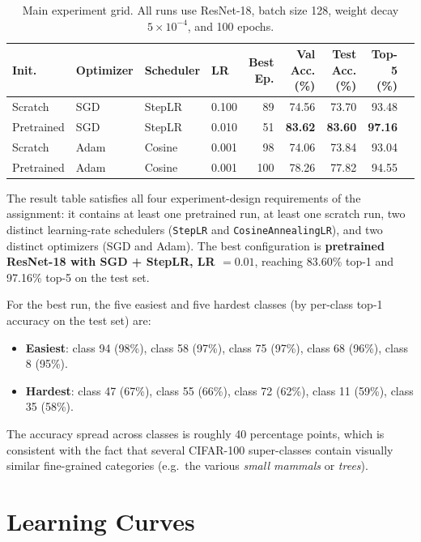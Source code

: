 \documentclass[10pt,a4paper]{article}
\begin{document}
\begin{table}[h]
\centering
\caption{Main experiment grid. All runs use ResNet-18, batch size 128, weight decay $5\times 10^{-4}$, and 100 epochs.}
\label{tab:results}
\begin{tabular}{llllrrrrr}
\toprule
Init. & Optimizer & Scheduler & LR & Best Ep. & Val Acc. (\%) & Test Acc. (\%) & Top-5 (\%) \\
\midrule
Scratch    & SGD  & StepLR & 0.100 &  89 & 74.56 & 73.70 & 93.48 \\
Pretrained & SGD  & StepLR & 0.010 &  51 & \textbf{83.62} & \textbf{83.60} & \textbf{97.16} \\
Scratch    & Adam & Cosine & 0.001 &  98 & 74.06 & 73.84 & 93.04 \\
Pretrained & Adam & Cosine & 0.001 & 100 & 78.26 & 77.82 & 94.55 \\
\bottomrule
\end{tabular}
\end{table}

The result table satisfies all four experiment-design requirements of the assignment: it contains at least one pretrained run, at least one scratch run, two distinct learning-rate schedulers (\texttt{StepLR} and \texttt{CosineAnnealingLR}), and two distinct optimizers (SGD and Adam). The best configuration is \textbf{pretrained ResNet-18 with SGD + StepLR, LR $= 0.01$}, reaching 83.60\% top-1 and 97.16\% top-5 on the test set.

For the best run, the five easiest and five hardest classes (by per-class top-1 accuracy on the test set) are:

\begin{itemize}[leftmargin=*,itemsep=0pt]
    \item \textbf{Easiest}: class 94 (98\%), class 58 (97\%), class 75 (97\%), class 68 (96\%), class 8 (95\%).
    \item \textbf{Hardest}: class 47 (67\%), class 55 (66\%), class 72 (62\%), class 11 (59\%), class 35 (58\%).
\end{itemize}

The accuracy spread across classes is roughly 40 percentage points, which is consistent with the fact that several CIFAR-100 super-classes contain visually similar fine-grained categories (e.g.\ the various \emph{small mammals} or \emph{trees}).

\section{Learning Curves}
\end{document}
